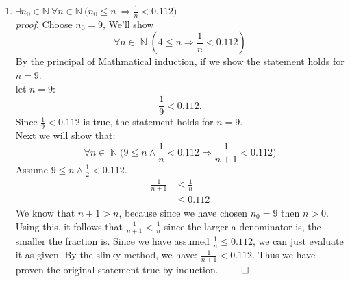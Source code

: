 \documentclass[11pt]{article}
\numberwithin{equation}{section}
\DeclareMathOperator*{\+}{\oplus}
\DeclareMathOperator*{\N}{\mathbb{N}}
\begin{document}
\begin{enumerate}[label= 2.\arabic*), itemsep=0.4cm]
  \item %
    $ \exists n_0 \in \mathbb{N} \ \forall n \in \mathbb{N} \ \Big (n_0 \leq n \ \Rightarrow \frac{1}{n} < 0.112 \Big )$\\
    \textit{proof}. Choose $n_0 = 9$, We'll show 
    $$\forall n \in \N (4 \leq n \Rightarrow \frac{1}{n} < 0.112)$$
By the principal of Mathmatical induction, if we show the statement holds for $n=9$.\\
    let $n=9$:
  $$\frac{1}{9} < 0.112.$$
  Since $\frac{1}{9} < 0.112$ is true, the statement holds for $n=9$.\\
Next we will show that: 
$$\forall n\in \N \Big(9 \leq n \land \frac{1}{n} < 0.112 \Rightarrow \frac{1}{n+1} < 0.112\Big)$$ 
Assume $9 \leq n \land \frac{1}{2}<0.112$.
\begin{align*}
  \frac{1}{n+1} &< \frac{1}{n}\\
                &\leq 0.112
\end{align*}
We know that $n+1 > n$, because since we have chosen $n_0 = 9$ then $n > 0$. Using this, it follows that $\frac{1}{n+1} < \frac{1}{n}$ since the larger a denominator is, the smaller the fraction is. Since we have assumed $\frac{1}{n} \leq 0.112$, we can just evaluate it as given. By the slinky method, we have: $\frac{1}{n+1} < 0.112$. Thus we have proven the original statement true by induction. $\qed$ 


\end{enumerate}
\end{document}
